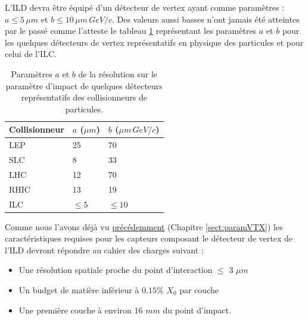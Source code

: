    L'ILD devra \^etre \'equip\'e d'un d\'etecteur de vertex ayant comme param\`etres : $a \leq 5 \, \mu m$ et $b \leq 10 \, \mu m \, GeV/c$. Des valeurs aussi basses n'ont jamais \'et\'e atteintes par le pass\'e comme l'atteste le tableau \ref{tab:AB} repr\'esentant les param\`etres $a$ et $b$ pour les quelques détecteurs de vertex représentatifs en physique des particules et pour celui de l'ILC.
   
  \begin{table}[h]
   \begin{center}
    \begin{tabular}{|l|l|l|} \hline
     Collisionneur & $a$ ($\mu m$) & $b$ ($\mu m \, GeV/c$) \\ \hline
     LEP           & 25          & 70                   \\ \hline
     SLC           & 8           & 33                   \\ \hline
     LHC           & 12          & 70                   \\ \hline
     RHIC          & 13          & 19                   \\ \hline
     ILC           & $\leq 5$    & $\leq 10$            \\ \hline
    \end{tabular}
    \caption{Param\`etres $a$ et $b$ de la r\'esolution sur le param\`etre d'impact de quelques détecteurs représentatifs des collisionneurs de particules.}
    \label{tab:AB}
   \end{center}
  \end{table}

  \medskip
  
  Comme nous l'avons déjà vu \hyperref[list:caracteristiques]{pr\'ec\'edemment} (Chapitre \ref{sect:paramVTX}) les caract\'eristiques requises pour les capteurs composant le d\'etecteur de vertex de l'ILD devront répondre au cahier des charges suivant : 
  
  \medskip
  
   \renewcommand{\labelitemi}{$\bullet$}
  \begin{itemize}
   \item Une r\'esolution spatiale proche du point d'interaction $\leq$ 3 $\mu m$
   \item Un budget de mati\`ere inf\'erieur \`a $0.15 \%$ $X_0$ par couche
   \item Une premi\`ere couche \`a environ 16 $mm$ du point d'impact.
   \end{itemize}
  
